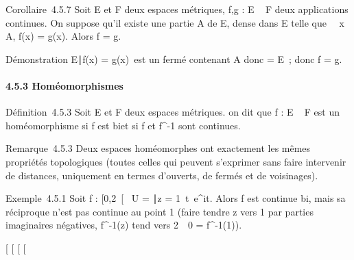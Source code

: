 \documentclass[]{article}
\begin{document}
Corollaire~4.5.7 Soit E et F deux espaces métriques, f,g : E \rightarrow~ F deux
applications continues. On suppose qu'il existe une partie A de E, dense
dans E telle que \forall~~x \in A, f(x) = g(x). Alors f
= g.

Démonstration \x \in E∣f(x) =
g(x)\ est un fermé contenant A donc
\overlineA = E~; donc f = g.

\paragraph{4.5.3 Homéomorphismes}

Définition~4.5.3 Soit E et F deux espaces métriques. on dit que f : E \rightarrow~
F est un homéomorphisme si f est bi\jmathective et si f et f^-1
sont continues.

Remarque~4.5.3 Deux espaces homéomorphes ont exactement les mêmes
propriétés topologiques (toutes celles qui peuvent s'exprimer sans faire
intervenir de distances, uniquement en termes d'ouverts, de fermés et de
voisinages).

Exemple~4.5.1 Soit f : {[}0,2\pi~{[}\rightarrow~ U = \z \in
{}∣\textbar{}z\textbar{} =
1\, t\mapsto~e^it. Alors
f est continue bi\jmathective, mais sa réciproque n'est pas continue au point
1 (faire tendre z vers 1 par parties imaginaires négatives,
f^-1(z) tend vers 2\pi~\neq~0 =
f^-1(1)).

{[}
{[}
{[}
{[}
\end{document}
